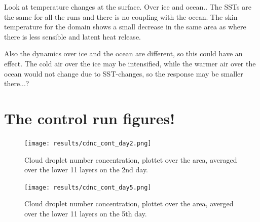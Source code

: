 Look at temperature changes at the surface. Over ice and ocean.. The SSTs are the same for all the runs and there is no coupling with the ocean. The skin temperature for the domain shows a small decrease in the same area as where there is less sensible and latent heat release.

Also the dynamics over ice and the ocean are different, so this could have an effect. The cold air over the ice may be intensified, while the warmer air over the ocean would not change due to SST-changes, so the response may be smaller there...?








\section{The control run figures!}
\begin{figure}[h]
\centering
\texttt{[image: results/cdnc\_cont\_day2.png]}
\caption{Cloud droplet number concentration, plottet over the area, averaged over the lower 11 layers on the 2nd day.}
\label{fig:cdnc_cont_Day2}
\end{figure}

\begin{figure}[h]
\centering
\texttt{[image: results/cdnc\_cont\_day5.png]}
\caption{Cloud droplet number concentration, plottet over the area, averged over the lower 11 layers on the 5th day.}
\label{fig:cdnc_cont_Day5}
\end{figure}

